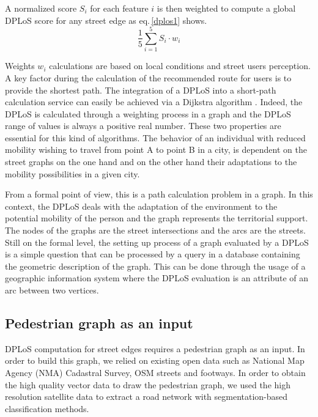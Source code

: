 \documentclass[10pt,conference,a4paper]{IEEEtran}
\begin{document}
A normalized score $S_{i}$ for each feature $i$ is then weighted to compute a global DPLoS score for any street edge as eq.\,\ref{dplos1} shows.
\begin{equation}
\frac{1}{5}\sum\limits_{i=1}^5 S_{i}\cdot{}w_{i}
\label{dplos1}
\end{equation}

Weights $w_{i}$ calculations are based on local conditions and street users perception. A key factor during the calculation of the recommended route for users is to provide the shortest path. The integration of a DPLoS into a short-path calculation service can easily be achieved via a Dijkstra algorithm \cite{dijkstra1959note}. Indeed, the DPLoS is calculated through a weighting process in a graph and the DPLoS range of values is always a positive real number. These two properties are essential for this kind of algorithms. The behavior of an individual with reduced mobility wishing to travel from point A to point B in a city, is dependent on the street graphs on the one hand and on the other hand their adaptations to the mobility possibilities in a given city.

From a formal point of view, this is a path calculation problem in a graph. In this context, the DPLoS deals with the adaptation of the environment to the potential mobility of the person and the graph represents the territorial support. The nodes of the graphs are the street intersections and the arcs are the streets. Still on the formal level, the setting up process of a graph evaluated by a DPLoS is a simple question that can be processed by a query in a database containing the geometric description of the graph. This can be done through the usage of a geographic information system where the DPLoS evaluation is an attribute of an arc between two vertices.


\subsection{Pedestrian graph as an input}
DPLoS computation for street edges requires a pedestrian graph as an input.
In order to build this graph, we relied on existing open data such as National Map Agency (NMA) Cadastral Survey, OSM streets and footways. In order to obtain the high quality vector data to draw the pedestrian graph, we used the high resolution satellite data to extract a road network with segmentation-based classification methods.
\end{document}
